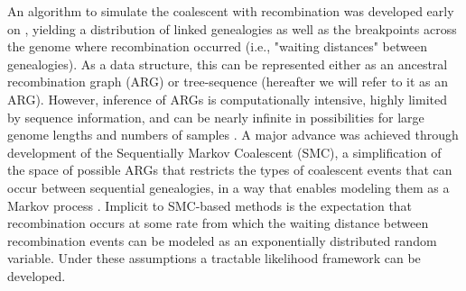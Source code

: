 \documentclass[11pt]{article}
\begin{document}
An algorithm to simulate the coalescent with recombination was developed early
on \citep{hudson1983properties},
yielding a distribution of linked
genealogies as well as the 
breakpoints across the genome where recombination occurred 
(i.e., "waiting distances" between genealogies).
As a data structure,
this can be represented either as an ancestral recombination graph (ARG)
\citep{griffiths_ancestral_1996} or tree-sequence \citep{kelleher2016efficient}
(hereafter we will refer to it as an ARG).
However, inference of ARGs is computationally intensive, highly limited by 
sequence information, and can be nearly infinite in possibilities for large 
genome lengths and numbers of samples \citep{mcvean2005approximating}. 
A major advance was achieved through development of the Sequentially Markov 
Coalescent (SMC), a simplification of the space of possible ARGs that 
restricts the types of coalescent events that can occur between sequential
genealogies, in a way that enables modeling
them as a Markov process 
\citep{mcvean2005approximating}. 
Implicit to SMC-based methods is the expectation that recombination occurs at 
some rate from which the waiting distance between recombination events can be modeled 
as an exponentially distributed random variable. 
Under these assumptions a tractable likelihood framework can be developed. 
\end{document}

